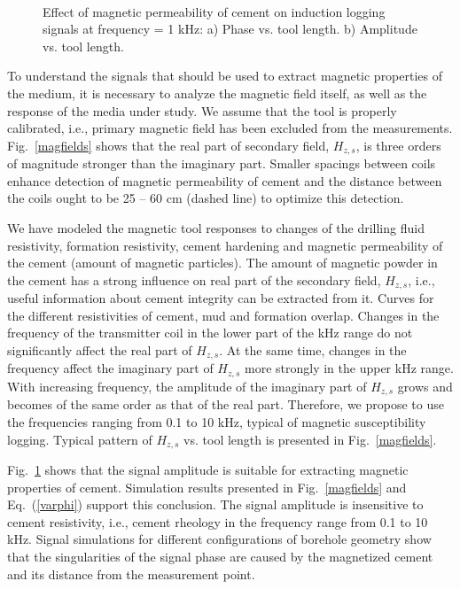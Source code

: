 \documentclass[10pt,twoside]{article}
\begin{document}
\begin{figure}[ht!]
\begin{minipage}{0.5\linewidth}
\end{minipage}
\caption{Effect of magnetic permeability of cement on induction logging signals at frequency = 1 kHz: a) Phase vs. tool length. b) Amplitude vs. tool length. }
\label{signals}\

\end{figure}

To understand the signals that should be used to extract magnetic properties of the medium, it is necessary to analyze the magnetic field itself, as well as the response of the media under study. We assume that the tool is properly calibrated, i.e., primary magnetic field has been excluded from the measurements. Fig.~\ref{magfields} shows that the real part of secondary field, $H_{z,s}$, is three orders of magnitude stronger than the imaginary part. Smaller spacings between coils enhance detection of magnetic permeability of cement and  the distance between the coils ought to be 25 -- 60 cm (dashed line) to optimize this detection.


We have modeled the magnetic tool responses to changes of the drilling fluid resistivity, formation resistivity, cement hardening and magnetic permeability of the cement (amount of magnetic particles). The amount of magnetic powder in the cement has a strong influence on real part of the secondary field, $H_{z,s}$, i.e., useful information about cement integrity can be extracted from it. Curves for the different resistivities of cement, mud and formation overlap. Changes in the frequency of the transmitter coil in the lower part of the kHz range do not significantly affect the real part of $H_{z,s}$. At the same time, changes in the frequency affect the imaginary part of $H_{z,s}$ more strongly in the upper kHz range. {With increasing frequency, the amplitude of the imaginary part of $H_{z,s}$ grows and becomes of the same order as that of the real part.} Therefore, we propose to use the frequencies ranging from 0.1 to 10 kHz, typical of magnetic susceptibility logging. Typical pattern of $H_{z,s}$ vs. tool length is presented in Fig.~\ref{magfields}.

Fig.~\ref{signals} shows that the signal amplitude is suitable for extracting magnetic properties of cement. Simulation results presented in Fig.~\ref{magfields} and Eq.~(\ref{varphi}) support this conclusion. The signal amplitude is insensitive to cement resistivity, i.e., cement rheology in the frequency range from 0.1 to 10 kHz. Signal simulations for different configurations of borehole geometry show that the singularities of the signal phase are caused by the magnetized cement and its distance from the measurement point.
\end{document}
